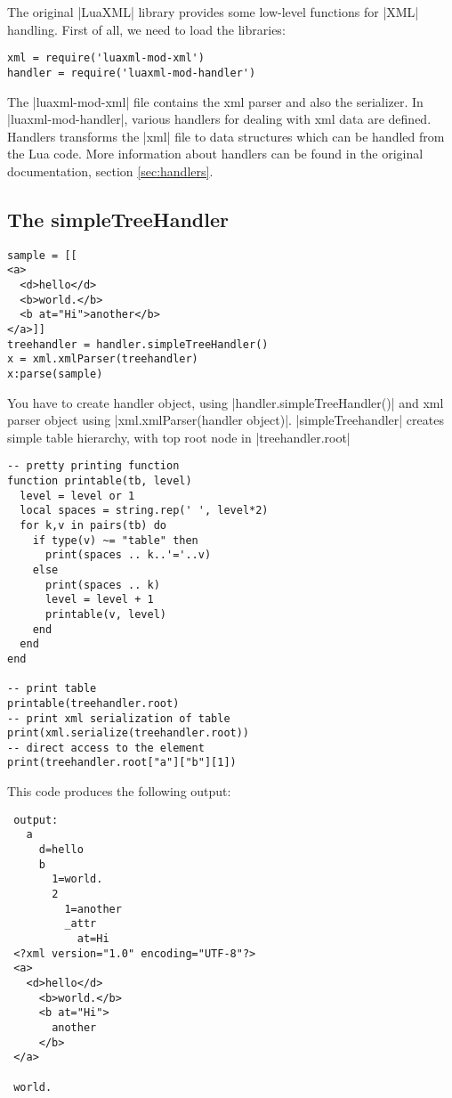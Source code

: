 \documentclass{ltxdoc}
\begin{document}

The original |LuaXML| library provides some low-level functions for |XML| handling.
First of all, we need to load the libraries:

\begin{verbatim}
xml = require('luaxml-mod-xml')
handler = require('luaxml-mod-handler')
\end{verbatim} 


The |luaxml-mod-xml| file contains the  xml parser and also the serializer. In
|luaxml-mod-handler|, various handlers for dealing with xml data are defined.
Handlers transforms the |xml| file to data structures which can be handled from
the Lua code. More information about handlers can be found in the original
documentation, section \ref{sec:handlers}.

\subsection{The simpleTreeHandler} 
\begin{verbatim}
sample = [[
<a>
  <d>hello</d>
  <b>world.</b>
  <b at="Hi">another</b>
</a>]]
treehandler = handler.simpleTreeHandler()
x = xml.xmlParser(treehandler)
x:parse(sample)
\end{verbatim} 

You have to create handler object, using |handler.simpleTreeHandler()| and xml
parser object using |xml.xmlParser(handler object)|. |simpleTreehandler|
creates simple table hierarchy, with top root node in |treehandler.root|

\begin{verbatim}
-- pretty printing function
function printable(tb, level)
  level = level or 1
  local spaces = string.rep(' ', level*2)
  for k,v in pairs(tb) do
    if type(v) ~= "table" then
      print(spaces .. k..'='..v)
    else
      print(spaces .. k)
      level = level + 1
      printable(v, level)
    end
  end
end

-- print table
printable(treehandler.root)
-- print xml serialization of table
print(xml.serialize(treehandler.root))
-- direct access to the element
print(treehandler.root["a"]["b"][1])
\end{verbatim}

This code produces the following output:

\begin{verbatim}
 output:
   a
     d=hello
     b
       1=world.
       2
         1=another
         _attr
           at=Hi
 <?xml version="1.0" encoding="UTF-8"?>
 <a>
   <d>hello</d>
     <b>world.</b>
     <b at="Hi">
       another
     </b>
 </a>
 
 world.
\end{verbatim}
\end{document}
